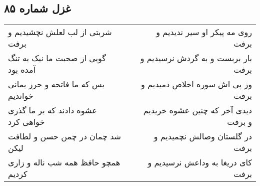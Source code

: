 \begin{center}
\section*{غزل شماره ۸۵}
\label{sec:sh085}
\begin{longtable}{l p{0.5cm} r}
شربتی از لب لعلش نچشیدیم و برفت
&&
روی مه پیکر او سیر ندیدیم و برفت
\\
گویی از صحبت ما نیک به تنگ آمده بود
&&
بار بربست و به گردش نرسیدیم و برفت
\\
بس که ما فاتحه و حرز یمانی خواندیم
&&
وز پی اش سوره اخلاص دمیدیم و برفت
\\
عشوه دادند که بر ما گذری خواهی کرد
&&
دیدی آخر که چنین عشوه خریدیم و برفت
\\
شد چمان در چمن حسن و لطافت لیکن
&&
در گلستان وصالش نچمیدیم و برفت
\\
همچو حافظ همه شب ناله و زاری کردیم
&&
کای دریغا به وداعش نرسیدیم و برفت
\\
\end{longtable}
\end{center}
